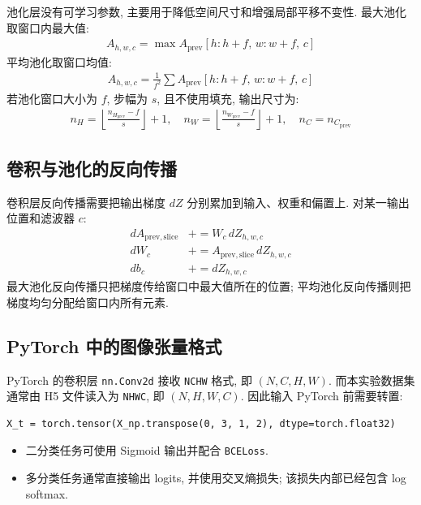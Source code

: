 \documentclass{../../nndlcourse}
\begin{document}
池化层没有可学习参数, 主要用于降低空间尺寸和增强局部平移不变性. 最大池化取窗口内最大值:
\begin{align}
    A_{h,w,c} = \max A_{\mathrm{prev}}[h:h+f,\,w:w+f,\,c]
\end{align}
平均池化取窗口均值:
\begin{align}
    A_{h,w,c} = \frac{1}{f^2}\sum A_{\mathrm{prev}}[h:h+f,\,w:w+f,\,c]
\end{align}
若池化窗口大小为 $f$, 步幅为 $s$, 且不使用填充, 输出尺寸为:
\begin{align}
    n_H = \left\lfloor \frac{n_{H_{\mathrm{prev}}}-f}{s}\right\rfloor + 1,\quad
    n_W = \left\lfloor \frac{n_{W_{\mathrm{prev}}}-f}{s}\right\rfloor + 1,\quad
    n_C = n_{C_{\mathrm{prev}}}
\end{align}

\subsection{卷积与池化的反向传播}

卷积层反向传播需要把输出梯度 $dZ$ 分别累加到输入、权重和偏置上. 对某一输出位置和滤波器 $c$:
\begin{align}
    dA_{\mathrm{prev,slice}} &\mathrel{+}= W_c\, dZ_{h,w,c} \\
    dW_c &\mathrel{+}= A_{\mathrm{prev,slice}}\, dZ_{h,w,c} \\
    db_c &\mathrel{+}= dZ_{h,w,c}
\end{align}
最大池化反向传播只把梯度传给窗口中最大值所在的位置; 平均池化反向传播则把梯度均匀分配给窗口内所有元素.

\subsection{PyTorch 中的图像张量格式}

PyTorch 的卷积层 \texttt{nn.Conv2d} 接收 \texttt{NCHW} 格式, 即 $(N,C,H,W)$. 而本实验数据集通常由 H5 文件读入为 \texttt{NHWC}, 即 $(N,H,W,C)$. 因此输入 PyTorch 前需要转置:
\begin{verbatim}
X_t = torch.tensor(X_np.transpose(0, 3, 1, 2), dtype=torch.float32)
\end{verbatim}
\begin{itemize}
    \item 二分类任务可使用 Sigmoid 输出并配合 \texttt{BCELoss}.
    \item 多分类任务通常直接输出 logits, 并使用交叉熵损失; 该损失内部已经包含 log softmax.
\end{itemize}
\end{document}
